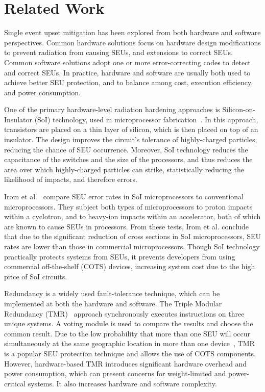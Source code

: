 \section{Related Work}\label{sec:related_work}

Single event upset mitigation has been explored from both hardware and software perspectives. Common hardware solutions focus on hardware design modifications to prevent radiation from causing SEUs, and extensions to correct SEUs. Common software solutions adopt one or more error-correcting codes to detect and correct SEUs. In practice, hardware and software are usually both used to achieve better SEU protection, and to balance among cost, execution efficiency, and power consumption.

One of the primary hardware-level radiation hardening approaches is Silicon-on-Insulator (SoI) technology, used in microprocessor fabrication~\cite{Celler2003SOI}. In this approach, transistors are placed on a thin layer of silicon, which is then placed on top of an insulator. The design improves the circuit's tolerance of highly-charged particles, reducing the chance of SEU occurrence. Moreover, SoI technology reduces the capacitance of the switches and the size of the processors, and thus reduces the area over which highly-charged particles can strike, statistically reducing the likelihood of impacts, and therefore errors.

Irom et al.~\cite{Irom2002SOI} compare SEU error rates in  SoI microprocessors to conventional microprocessors. They subject both types of microprocessors to proton impacts within a cyclotron, and to heavy-ion impacts within an accelerator, both of which are known to cause SEUs in processors. From these tests, Irom et al. conclude that due to the significant reduction of cross sections in SoI microprocessors, SEU rates are lower than those in commercial microprocessors. Though SoI technology practically protects systems from SEUs, it prevents developers from using commercial off-the-shelf (COTS) devices, increasing system cost due to the high price of SoI circuits.

Redundancy is a widely used fault-tolerance technique, which can be implemented at both the hardware and software. The Triple Modular Redundancy (TMR)~\cite{TMR} approach synchronously executes instructions on three unique systems. A voting module is used to compare the results and choose the common result. Due to the low probability that more than one SEU will occur simultaneously at the same geographic location in more than one device~\cite{underwood1992observations}, TMR is a popular SEU protection technique and allows the use of COTS components. However, hardware-based TMR introduces significant hardware overhead and power consumption, which can present concerns for weight-limited and power-critical systems. It also increases hardware and software complexity. 

